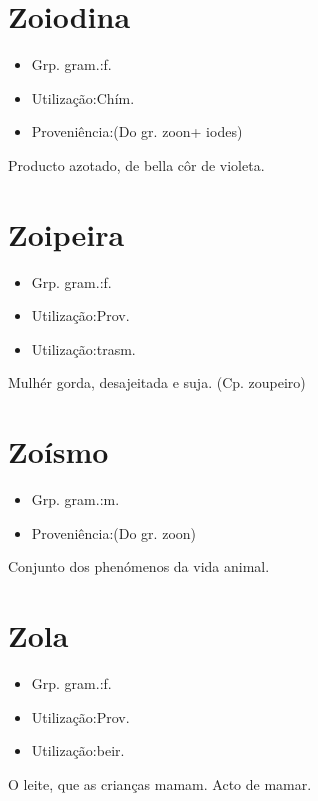 \section{Zoiodina}
\begin{itemize}
\item {Grp. gram.:f.}
\end{itemize}
\begin{itemize}
\item {Utilização:Chím.}
\end{itemize}
\begin{itemize}
\item {Proveniência:(Do gr. \textunderscore zoon\textunderscore  + \textunderscore iodes\textunderscore )}
\end{itemize}
Producto azotado, de bella côr de violeta.
\section{Zoipeira}
\begin{itemize}
\item {Grp. gram.:f.}
\end{itemize}
\begin{itemize}
\item {Utilização:Prov.}
\end{itemize}
\begin{itemize}
\item {Utilização:trasm.}
\end{itemize}
Mulhér gorda, desajeitada e suja.
(Cp. \textunderscore zoupeiro\textunderscore )
\section{Zoísmo}
\begin{itemize}
\item {Grp. gram.:m.}
\end{itemize}
\begin{itemize}
\item {Proveniência:(Do gr. \textunderscore zoon\textunderscore )}
\end{itemize}
Conjunto dos phenómenos da vida animal.
\section{Zola}
\begin{itemize}
\item {Grp. gram.:f.}
\end{itemize}
\begin{itemize}
\item {Utilização:Prov.}
\end{itemize}
\begin{itemize}
\item {Utilização:beir.}
\end{itemize}
O leite, que as crianças mamam.
Acto de mamar.
